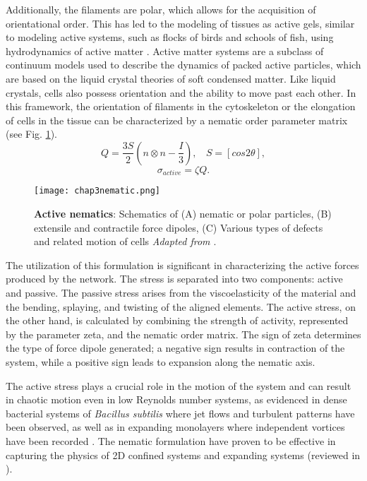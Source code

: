 Additionally, the filaments are polar, which allows for the acquisition of orientational order. This has led to the modeling of tissues as active gels, similar to modeling active systems, such as flocks of birds and schools of fish, using hydrodynamics of active matter \cite{julicher2018}. Active matter systems are a subclass of continuum models used to describe the dynamics of packed active particles, which are based on the liquid crystal theories of soft condensed matter. Like liquid crystals, cells also possess orientation and the ability to move past each other. In this framework, the orientation of filaments in the cytoskeleton or the elongation of cells in the tissue can be characterized by a nematic order parameter matrix (see Fig. \ref{fig_3_10}).
$$Q = \frac{3S}{2}\left(n\otimes n  -       \frac{I}{3}\right),\ \ \ \ S = [cos2\theta], $$
$$ \sigma_{active} = \zeta Q.$$

\begin{figure}[t]
	\centering
	\texttt{[image: chap3nematic.png]}
	\caption{\label{fig_3_10} \textbf{Active nematics}: Schematics of (A) nematic or polar particles, (B) extensile and contractile force dipoles, (C) Various types of defects and related motion of cells \textit{Adapted from \cite{xi2018}}. 
	}
\end{figure}

The utilization of this formulation is significant in characterizing the active forces produced by the network. The stress is separated into two components: active and passive. The passive stress arises from the viscoelasticity of the material and the bending, splaying, and twisting of the aligned elements. The active stress, on the other hand, is calculated by combining the strength of activity, represented by the parameter zeta, and the nematic order matrix. The sign of zeta determines the type of force dipole generated; a negative sign results in contraction of the system, while a positive sign leads to expansion along the nematic axis.

The active stress plays a crucial role in the motion of the system and can result in chaotic motion even in low Reynolds number systems, as evidenced in dense bacterial systems of \textit{Bacillus subtilis} where jet flows and turbulent patterns have been observed, as well as in expanding monolayers where independent vortices have been recorded \cite{wensink2012, blanch-mercader2018}. The nematic formulation have proven to be effective in capturing the physics of 2D confined systems and expanding systems (reviewed in \cite{saw2018}).

